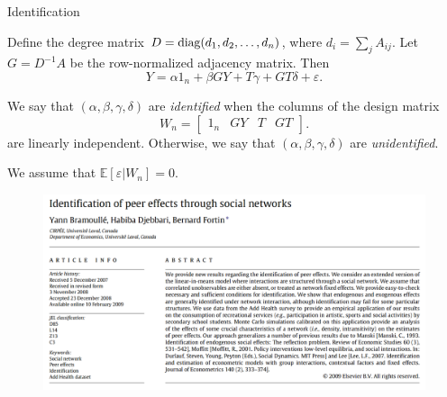 \documentclass[aspectratio=169]{beamer}
\theoremstyle{remark}
\begin{document}
\begin{frame}{Identification}
    
    Define the degree matrix $D = \operatorname*{diag}(d_1, d_2, \dots, d_n)$, where $d_i = \sum_j A_{ij}$. Let $G = D^{-1} A$ be the row-normalized adjacency matrix. Then
    \begin{equation*} \label{eq:lim-mv}
        Y = \alpha 1_n + \beta G Y + T \gamma + G T \delta + \varepsilon.
    \end{equation*}
    
    \begin{definition}
        We say that $(\alpha, \beta, \gamma, \delta)$ are \emph{identified} when the columns of the design matrix 
        \begin{equation*}
            \label{eq:design}
            W_n = \begin{bmatrix} 1_n & GY & T & GT \end{bmatrix}.
        \end{equation*}
        are linearly independent. Otherwise, we say that $(\alpha, \beta, \gamma, \delta)$ are \emph{unidentified}.
    \end{definition}
    
    We assume that $\mathbb E \left[\varepsilon | W_n \right] = 0$.
\end{frame}

\begin{frame}
    \begin{figure}
        \centering
        \includegraphics[width=\textwidth]{figures/bramoulle2009.png}
    \end{figure}
\end{frame}
\end{document}

